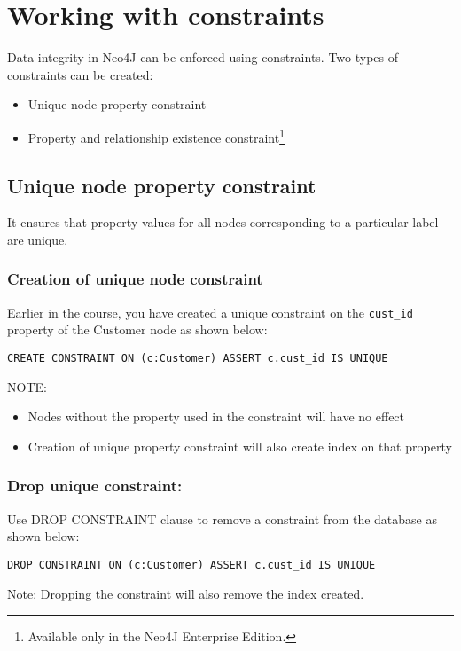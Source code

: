\documentclass[../main.tex]{subfiles}
\begin{document}
\section{Working with constraints}
Data integrity in Neo4J can be enforced using constraints. Two types of constraints can be created:
\begin{itemize}
	\item Unique node property constraint
	\item Property and relationship existence constraint\footnote{\small{Available only in the Neo4J Enterprise Edition.}}
\end{itemize}
\subsection{Unique node property constraint}
It ensures that property values for all nodes corresponding to a particular label are unique.
\subsubsection{Creation of unique node constraint}
Earlier in the course, you have created a unique constraint on the \lstinline{cust_id} property of the Customer node as shown below:
\begin{lstlisting}[language=cypher]
CREATE CONSTRAINT ON (c:Customer) ASSERT c.cust_id IS UNIQUE
\end{lstlisting}
NOTE: 
\begin{itemize}
\item Nodes without the property used in the constraint will have no effect
\item Creation of unique property constraint will also create index on that property
\end{itemize}
\subsubsection{Drop unique constraint:}
Use DROP CONSTRAINT clause to remove a constraint from the database as shown below:
\begin{lstlisting}[language=cypher]
DROP CONSTRAINT ON (c:Customer) ASSERT c.cust_id IS UNIQUE
\end{lstlisting}
Note: Dropping the constraint will also remove the index created.
\end{document}
